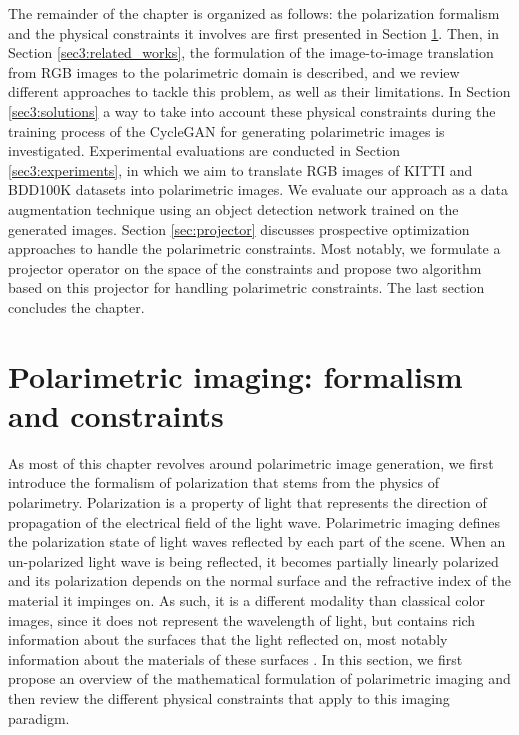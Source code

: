 The remainder of the chapter is organized as follows:  the polarization formalism and the physical constraints it involves are first presented in Section \ref{sec3:physical_prop}. Then, in Section \ref{sec3:related_works}, the formulation of the image-to-image translation from \ac{RGB} images to the polarimetric domain is described, and we review different approaches to tackle this problem, as well as their limitations. In Section \ref{sec3:solutions} a way to take into account these physical constraints during the training process of the CycleGAN for generating polarimetric images is investigated. Experimental evaluations are conducted in Section \ref{sec3:experiments}, in which we aim to translate RGB images of KITTI and BDD100K datasets into polarimetric images. We evaluate our approach as a data augmentation technique using an object detection network trained on the generated images. Section \ref{sec:projector} discusses prospective optimization approaches to handle the polarimetric constraints. Most notably, we formulate a projector operator on the space of the constraints and propose two algorithm based on this projector for handling polarimetric constraints. The last section concludes the chapter.


\section{Polarimetric imaging: formalism and constraints}
\label{sec3:physical_prop}

As most of this chapter revolves around polarimetric image generation, we first introduce the formalism of polarization that stems from the physics of polarimetry.  Polarization is a property of light that represents the direction of propagation of the electrical field of the light wave. Polarimetric imaging defines the polarization state of light waves reflected by each part of the scene. When an un-polarized light wave is being reflected, it becomes partially linearly polarized and its polarization depends on the normal surface  and the refractive index of the material it impinges on. As such, it is a different modality than classical color images, since it does not represent the wavelength of light, but contains rich information about the surfaces that the light reflected on, most notably information about the materials of these surfaces \citep{Gross2012}. In this section, we first propose an overview of the mathematical formulation of polarimetric imaging and then review the different physical constraints that apply to this imaging paradigm.

